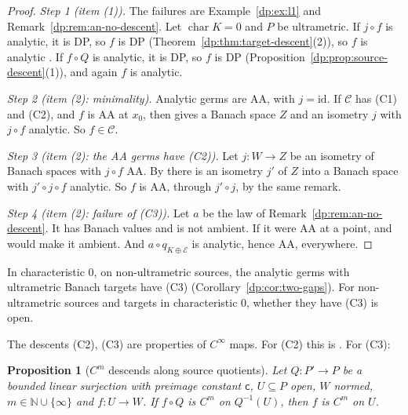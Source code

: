 \documentclass[11pt]{amsart}
\newtheorem{proposition}[theorem]{Proposition}
\theoremstyle{definition}
\theoremstyle{remark}
\numberwithin{equation}{section}
\newcommand{\N}{\mathbb N}
\newcommand{\id}{\mathrm{id}}
\newcommand{\cC}{\mathcal{C}}
\theoremstyle{plain}
\theoremstyle{definition}
\theoremstyle{plain}
\begin{document}
\begin{proof}
\emph{Step 1 (item (1)).} The failures are Example~\ref{dp:ex:l1} and Remark~\ref{dp:rem:an-no-descent}. Let $\operatorname{char}K=0$ and $P$ be ultrametric. If $j\circ f$ is analytic, it is DP, so $f$ is DP (Theorem~\ref{dp:thm:target-descent}(2)), so $f$ is analytic \cite[Proposition~14.40(2)]{I}. If $f\circ Q$ is analytic, it is DP, so $f$ is DP (Proposition~\ref{dp:prop:source-descent}(1)), and again $f$ is analytic.

\emph{Step 2 (item (2): minimality).} Analytic germs are AA, with $j=\id$. If $\cC$ has (C1) and (C2), and $f$ is AA at $x_0$, then \cite[Remark~14.13]{I} gives a Banach space $Z$ and an isometry $j$ with $j\circ f$ analytic. So $f\in\cC$.

\emph{Step 3 (item (2): the AA germs have (C2)).} Let $j\colon W\to Z$ be an isometry of Banach spaces with $j\circ f$ AA. By \cite[Remark~14.13]{I} there is an isometry $j'$ of $Z$ into a Banach space with $j'\circ j\circ f$ analytic. So $f$ is AA, through $j'\circ j$, by the same remark.

\emph{Step 4 (item (2): failure of (C3)).} Let $a$ be the law of Remark~\ref{dp:rem:an-no-descent}. It has Banach values and is not ambient. If it were AA at a point, \cite[Remark~14.13]{I} and \cite[Proposition~14.9(2)]{I} would make it ambient. And $a\circ q_{K\oplus\mathcal E}$ is analytic, hence AA, everywhere.
\end{proof}

In characteristic $0$, on non-ultrametric sources, the analytic germs with ultrametric Banach targets have (C3) (Corollary~\ref{dp:cor:two-gaps}). For non-ultrametric sources and targets in characteristic $0$, whether they have (C3) is open.

The descents (C2), (C3) are properties of $C^\infty$ maps. For (C2) this is \cite[Lemma~2.4]{I}. For (C3):

\begin{proposition}[$C^m$ descends along source quotients]\label{dp:prop:cn-descends}
Let $Q\colon P'\to P$ be a bounded linear surjection with preimage constant $\mathsf c$, $U\subseteq P$ open, $W$ normed, $m\in\N\cup\{\infty\}$ and $f\colon U\to W$. If $f\circ Q$ is $C^m$ on $Q^{-1}(U)$, then $f$ is $C^m$ on $U$.
\end{proposition}
\end{document}
